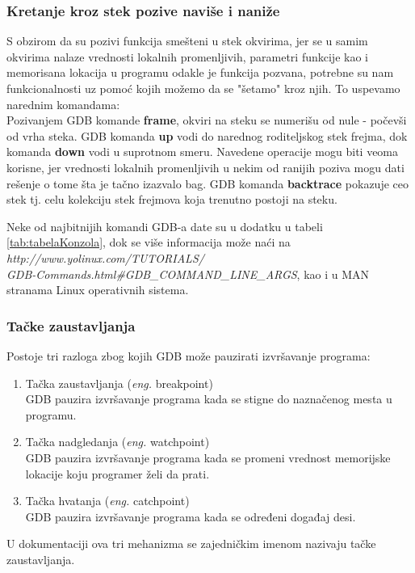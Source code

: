 \documentclass[a4paper]{article}
\begin{document}
\subsubsection{Kretanje kroz stek pozive naviše i naniže}
\label{subsec:debager_stek}

S obzirom da su pozivi funkcija smešteni u stek okvirima, jer se u samim okvirima nalaze vrednosti
lokalnih promenljivih, parametri funkcije kao i memorisana lokacija u programu odakle je funkcija pozvana, 
potrebne su nam funkcionalnosti uz pomoć kojih možemo da se "šetamo" kroz njih.
To uspevamo narednim komandama: \\
\indent Pozivanjem GDB komande \textbf{frame}, okviri na steku se numerišu od nule - počevši
od vrha steka. \newline 
\indent GDB komanda \textbf{up} vodi do narednog roditeljskog stek frejma, dok komanda \textbf{down} 
vodi u suprotnom smeru. Navedene operacije mogu biti veoma korisne, jer vrednosti lokalnih 
promenljivih u nekim od ranijih poziva mogu dati rešenje o tome šta je tačno izazvalo bag\cite{art_debugging}. 
GDB komanda \textbf{backtrace} pokazuje ceo stek tj. celu kolekciju stek frejmova koja trenutno postoji na steku.

Neke od najbitnijih komandi GDB-a date su u dodatku u tabeli \ref{tab:tabelaKonzola}, dok se više informacija
može naći na \textit{http://www.yolinux.com/TUTORIALS/\\GDB-Commands.html\#GDB\_COMMAND\_LINE\_ARGS},
kao i u MAN stranama Linux operativnih sistema.

\subsubsection{Tačke zaustavljanja}
\label{subsec:gdbtackezaustavljanja}

Postoje tri razloga zbog kojih GDB može pauzirati izvršavanje programa:\cite{art_debugging}
\begin{enumerate}
\item Tačka zaustavljanja (\textit{eng.} breakpoint) \\
GDB pauzira izvršavanje programa kada se stigne do naznačenog mesta u programu.
\item Tačka nadgledanja (\textit{eng.} watchpoint) \\ 
GDB pauzira izvršavanje programa kada se promeni vrednost memorijske lokacije koju programer želi da prati.
\item Tačka hvatanja (\textit{eng.} catchpoint) \\
GDB pauzira izvršavanje programa kada se određeni događaj desi.
\end{enumerate}
U dokumentaciji ova tri mehanizma se zajedničkim imenom nazivaju tačke zaustavljanja. 
\end{document}
